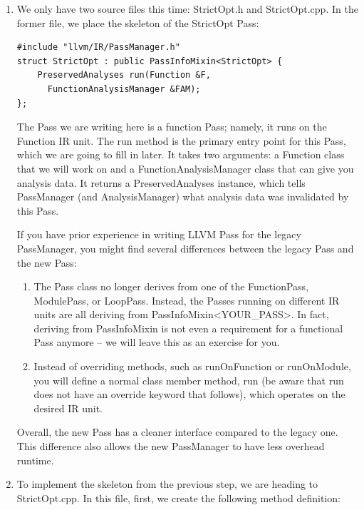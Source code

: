\begin{enumerate}
\item We only have two source files this time: StrictOpt.h and StrictOpt.cpp. In the former file, we place the skeleton of the StrictOpt Pass:

\begin{lstlisting}[style=styleCXX]
#include "llvm/IR/PassManager.h"
struct StrictOpt : public PassInfoMixin<StrictOpt> {
	PreservedAnalyses run(Function &F,
	  FunctionAnalysisManager &FAM);
};
\end{lstlisting}

The Pass we are writing here is a function Pass; namely, it runs on the Function IR unit. The run method is the primary entry point for this Pass, which we are going to fill in later. It takes two arguments: a Function class that we will work on and a FunctionAnalysisManager class that can give you analysis data. It returns a PreservedAnalyses instance, which tells PassManager (and AnalysisManager) what analysis data was invalidated by this Pass.

If you have prior experience in writing LLVM Pass for the legacy PassManager, you might find several differences between the legacy Pass and the new Pass:

\begin{enumerate}[label=\alph*)]
\item  The Pass class no longer derives from one of the FunctionPass, ModulePass, or LoopPass. Instead, the Passes running on different IR units are all deriving from PassInfoMixin<YOUR\_PASS>. In fact, deriving from PassInfoMixin is not even a requirement for a functional Pass anymore – we will leave this as an exercise for you.

\item  Instead of overriding methods, such as runOnFunction or runOnModule, you will define a normal class member method, run (be aware that run does not have an override keyword that follows), which operates on the desired IR unit.

\end{enumerate}

Overall, the new Pass has a cleaner interface compared to the legacy one. This difference also allows the new PassManager to have less overhead runtime.

\item To implement the skeleton from the previous step, we are heading to StrictOpt.cpp. In this file, first, we create the following method definition:


\end{enumerate}
